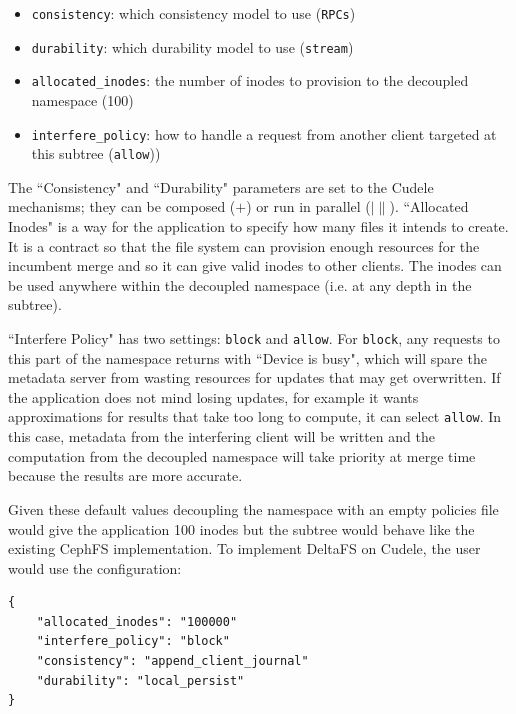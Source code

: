 \begin{itemize}

  \item \texttt{consistency}: which consistency model to use (\texttt{RPCs})

  \item \texttt{durability}: which durability model to use (\texttt{stream})

  \item \texttt{allocated\_inodes}: the number of inodes to provision to the
  decoupled namespace (100)

  \item \texttt{interfere\_policy}: how to handle a request from another
  client targeted at this subtree (\texttt{allow}))

\end{itemize}

The ``Consistency" and ``Durability" parameters are set to the Cudele
mechanisms; they can be composed (\(+\)) or run in parallel (\(|\|\)).
``Allocated Inodes" is a way for the application to specify how many files it
intends to create. It is a contract so that the file system can provision
enough resources for the incumbent merge and so it can give valid inodes to
other clients. The inodes can be used anywhere within the decoupled namespace
({i.e.} at any depth in the subtree).

``Interfere Policy" has two settings: \texttt{block} and \texttt{allow}.
For \texttt{block}, any requests to this part of the namespace returns with
``Device is busy", which will spare the metadata server from wasting resources
for updates that may get overwritten. If the application does not mind losing
updates, for example it wants approximations for results that take too long to
compute, it can select \texttt{allow}. In this case, metadata from the interfering client will be
written and the computation from the decoupled namespace will take priority at
merge time because the results are more accurate.

Given these default values decoupling the namespace with an empty policies file
would give the application 100 inodes but the subtree would behave like the
existing CephFS implementation. To implement DeltaFS on Cudele, the user
would use the configuration:

\begin{listing}[h]
\begin{verbatim}
{     
    "allocated_inodes": "100000"
    "interfere_policy": "block"
    "consistency": "append_client_journal"
    "durability": "local_persist"
}
\end{verbatim}
\end{listing}


